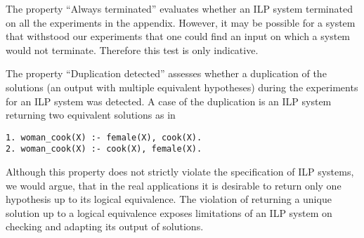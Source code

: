 The property ``Always terminated'' evaluates whether an ILP system terminated on all the experiments in the appendix. However, it may be possible for a system that withstood our experiments that one could find an input on which a system would not terminate. Therefore this test is only indicative.

The property ``Duplication detected'' assesses whether a duplication of the solutions
(an output with multiple equivalent hypotheses)
during the experiments for an ILP system was detected.
A case of the duplication is an ILP system returning two equivalent solutions as in
\begin{lstlisting}
1. woman_cook(X) :- female(X), cook(X).
2. woman_cook(X) :- cook(X), female(X).
\end{lstlisting}
Although this property does not strictly violate the specification of ILP systems, we would argue, that in the real applications it is desirable to return only one hypothesis up to its logical equivalence. The violation of returning a unique solution up to a logical equivalence exposes limitations of an ILP system on checking and adapting its output of solutions.

